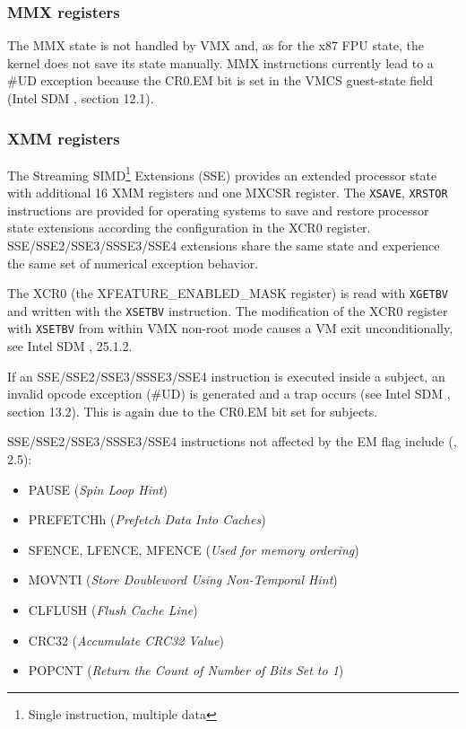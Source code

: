 \subsubsection{MMX registers}
The MMX state is not handled by VMX and, as for the x87 FPU state, the kernel
does not save its state manually. MMX instructions currently lead to a \#UD
exception because the CR0.EM bit is set in the VMCS guest-state field (Intel SDM
\cite{IntelSDM}, section 12.1).

\subsubsection{XMM registers}
The Streaming SIMD\footnote{Single instruction, multiple data}
Extensions (SSE) provides an extended processor state with
additional 16 XMM registers and one MXCSR register. The \texttt{XSAVE},
\texttt{XRSTOR} instructions are provided for operating systems to save and
restore processor state extensions according the configuration in the XCR0
register. SSE/SSE2/SSE3/SSSE3/SSE4 extensions share the same state and
experience the same set of numerical exception behavior.

The XCR0 (the XFEATURE\_ENABLED\_MASK register) is read with
\texttt{XGETBV} and written with the \texttt{XSETBV} instruction. The
modification of the XCR0 register with \texttt{XSETBV} from within VMX non-root
mode causes a VM exit unconditionally, see Intel SDM \cite{IntelSDM}, 25.1.2.

If an SSE/SSE2/SSE3/SSSE3/SSE4 instruction is executed inside a subject, an
invalid opcode exception (\#UD) is generated and a trap occurs (see Intel SDM
\cite{IntelSDM}, section 13.2). This is again due to the CR0.EM bit set for
subjects.

SSE/SSE2/SSE3/SSSE3/SSE4 instructions not affected by the EM flag include
(\cite{IntelSDM}, 2.5):
\begin{itemize}
	\item PAUSE (\emph{Spin Loop Hint})
	\item PREFETCHh (\emph{Prefetch Data Into Caches})
	\item SFENCE, LFENCE, MFENCE (\emph{Used for memory ordering})
	\item MOVNTI (\emph{Store Doubleword Using Non-Temporal Hint})
	\item CLFLUSH (\emph{Flush Cache Line})
	\item CRC32 (\emph{Accumulate CRC32 Value})
	\item POPCNT (\emph{Return the Count of Number of Bits Set to 1})
\end{itemize}

